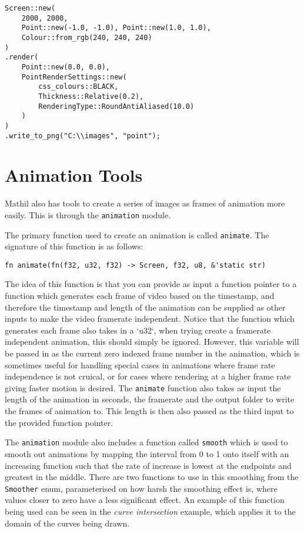 \begin{lstlisting}
Screen::new(
    2000, 2000,
    Point::new(-1.0, -1.0), Point::new(1.0, 1.0),
    Colour::from_rgb(240, 240, 240)
)
.render(
    Point::new(0.0, 0.0),
    PointRenderSettings::new(
        css_colours::BLACK,
        Thickness::Relative(0.2),
        RenderingType::RoundAntiAliased(10.0)
    )
)
.write_to_png("C:\\images", "point");
\end{lstlisting}

\section{Animation Tools}

Mathil also has tools to create a series of images as frames of animation more easily. This is through the \verb|animation| module.

The primary function used to create an animation is called \verb|animate|. The signature of this function is as follows:

\begin{lstlisting}
fn animate(fn(f32, u32, f32) -> Screen, f32, u8, &'static str)
\end{lstlisting}

The idea of this function is that you can provide as input a function pointer to a function which generates each frame of video based on the timestamp, and therefore the timestamp and length of the animation can be supplied as other inputs to make the video framerate independent. Notice that the function which generates each frame also takes in a `u32`, when trying create a framerate independent animation, this should simply be ignored. However, this variable will be passed in as the current zero indexed frame number in the animation, which is sometimes useful for handling special cases in animations where frame rate independence is not cruical, or for cases where rendering at a higher frame rate giving faster motion is desired. The \verb|animate| function also takes as input the length of the animation in seconds, the framerate and the output folder to write the frames of animation to. This length is then also passed as the third input to the provided function pointer.

The \verb|animation| module also includes a function called \verb|smooth| which is used to smooth out animations by mapping the interval from 0 to 1 onto itself with an increasing function such that the rate of increase is lowest at the endpoints and greatest in the middle. There are two functions to use in this smoothing from the \verb|Smoother| enum, parameterised on how harsh the smoothing effect is, where values closer to zero have a less significant effect. An example of this function being used can be seen in the \emph{curve intersection} example, which applies it to the domain of the curves being drawn.

